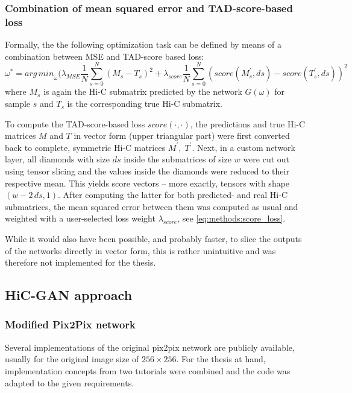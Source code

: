 \subsubsection{Combination of mean squared error and TAD-score-based loss} \label{sec:methods:score_loss}
Formally, the the following optimization task can be defined by means of a combination between MSE and TAD-score based loss:
\begin{equation}
 \omega^* = \mathit{arg\,min}_\omega (  \lambda_\mathit{MSE} \frac{1}{N} \sum_{s=0}^N (M_s - T_s)^2
                                                    + \lambda_\mathit{score} \frac{1}{N} \sum_{s=0}^N (\mathit{score}(M^\prime_s,ds) - \mathit{score}(T^\prime_s,ds))^2 \label{eq:methods:score_loss}
\end{equation}
where $M_s$ is again the Hi-C submatrix predicted by the network $G(\omega)$ for sample $s$ and $T_s$ is the corresponding true Hi-C submatrix.

To compute the TAD-score-based loss $\mathit{score}(\cdot,\cdot)$, the predictions and true Hi-C matrices $M$ and $T$ in vector form (upper triangular part)
were first converted back to complete, symmetric Hi-C matrices $M^\prime,\; T^\prime$. 
Next, in a custom network layer, all diamonds with size $ds$ inside the submatrices of size $w$ were cut out using tensor slicing and the values inside the diamonds were reduced to their respective mean.
This yields score vectors -- more exactly, tensors with shape $(w - 2\,ds, 1)$.
After computing the latter for both predicted- and real Hi-C submatrices, the mean squared error between them was computed as usual and weighted with 
a user-selected loss weight $\lambda_\mathit{score}$, see \cref{eq:methods:score_loss}.

While it would also have been possible, and probably faster, to slice the outputs of the networks directly in vector form, 
this is rather unintuitive and was therefore not implemented for the thesis. 

\subsection{HiC-GAN approach}
\subsubsection{Modified Pix2Pix network}\label{sec:methods:cGAN_initial}
Several implementations of the original pix2pix network are publicly available, usually for the original image size of $256\times256$.
For the thesis at hand, implementation concepts from two tutorials \xxx were combined and the code was adapted to the given requirements.

